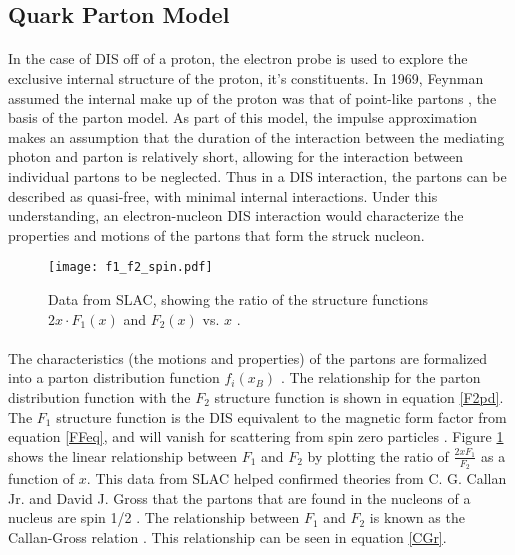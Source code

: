 \subsection{Quark Parton Model}
\paragraph{}In the case of DIS off of a proton, the electron probe is used to explore the exclusive internal structure of the proton, it's constituents. In 1969, Feynman assumed the internal make up of the proton was that of point-like partons \cite{Briskin_thesis,DISproton}, the basis of the parton model. As part of this model, the impulse approximation makes an assumption that the duration of the interaction between the mediating photon and parton is relatively short, allowing for the interaction between individual partons to be neglected. Thus in a DIS interaction, the partons can be described as quasi-free, with minimal internal interactions. Under this understanding, an electron-nucleon DIS interaction would characterize the properties and motions of the partons that form the struck nucleon\cite{DISproton}.

\begin{figure}[t]
	\centering
	\texttt{[image: f1\_f2\_spin.pdf]} 
	\caption{Data from SLAC, showing the ratio of the structure functions $2x\cdot F_1(x)$ and $F_2(x)$ vs. $x$ \cite{PnN,IntroHEP}.}
	\label{fig:spin1/2}
\end{figure} 

\paragraph{}The characteristics (the motions and properties) of the partons are formalized into a parton distribution function $f_i(x_B)$ \cite{PnN}. The relationship for the parton distribution function with the $F_2$ structure function is shown in equation \ref{F2pd}. The $F_1$ structure function is the DIS equivalent to the magnetic form factor from equation \ref{FFeq}, and will vanish for scattering from spin zero particles \cite{PnN}. Figure \ref{fig:spin1/2} shows the linear relationship between $F_1$ and $F_2$ by plotting the ratio of $\frac{2xF_1}{F_2}$ as a function of $x$. This data from SLAC helped confirmed theories from C. G. Callan Jr. and David J. Gross that the partons that are found in the nucleons of a nucleus are spin 1/2 \cite{callan,DISquark}. The relationship between $F_1$ and $F_2$ is known as the Callan-Gross relation \cite{PnN}. This relationship can be seen in equation \ref{CGr}. 


